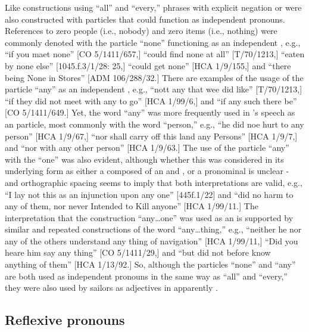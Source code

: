 Like constructions using “all” and “every,” phrases with explicit negation or  were also constructed with  particles that could function as independent pronouns. References to zero people (i.e., nobody) and zero items (i.e., nothing) were commonly denoted with the particle “none” functioning as an independent , e.g., “if you maet none” [CO 5/1411/657,] “could find none at all” [T/70/1213,] “eaten by none else” [1045.f.3/1/28: 25,] “could get none” [HCA 1/9/155,] and “there being None in Stores” [ADM 106/288/32.] There are examples of the usage of the particle “any” as an independent , e.g., “nott any that wee did like” [T/70/1213,] “if they did not meet with any to go” [HCA 1/99/6,] and “if any such there be” [CO 5/1411/649.] Yet, the word “any” was more frequently used in ’s speech as an  particle, most commonly with the word “person,” e.g., “he did noe hurt to any person” [HCA 1/9/67,] “nor shall carry off this land any Persons” [HCA 1/9/7,] and “nor with any other person” [HCA 1/9/63.] The use of the particle “any” with the  “one” was also evident, although whether this was considered in its underlying form as either a  composed of an  and , or a pronominal  is unclear - and orthographic spacing seems to imply that both interpretations are valid, e.g., “I lay not this as an injunction upon any one” [445f.1/22] and “did no harm to any of them, nor never Intended to Kill anyone” [HCA 1/99/11.] The interpretation that the construction “any…one” was used as an   is supported by similar and repeated constructions of the word “any…thing,” e.g., “neither he nor any of the others understand any thing of navigation” [HCA 1/99/11,] “Did you heare him say any thing” [CO 5/1411/29,] and “but did not before know anything of them” [HCA 1/13/92.] So, although the particles “none” and “any” are both used as independent pronouns in the same way as “all” and “every,” they were also used by sailors as  adjectives in apparently .

\subsection{{Reflexive pronouns}}%

